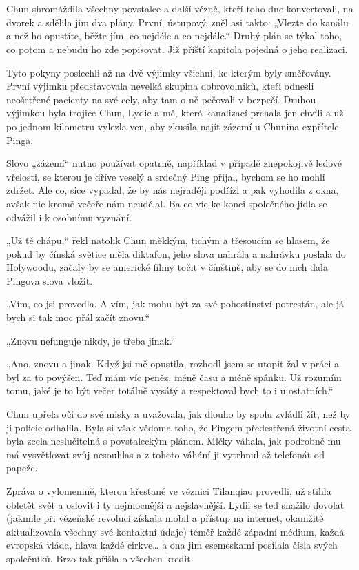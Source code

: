 \chapter{}

Chun shromáždila všechny povstalce a další vězně, kteří toho dne konvertovali, na dvorek a sdělila jim dva plány. První, ústupový, zněl asi takto: „Vlezte do kanálu a než ho opustíte, běžte jím, co nejdéle a co nejdále.“ Druhý plán se týkal toho, co potom a nebudu ho zde popisovat. Již příští kapitola pojedná o jeho realizaci. 

Tyto pokyny poslechli až na dvě výjimky všichni, ke kterým byly směřovány. První výjimku představovala nevelká skupina dobrovolníků, kteří odnesli neošetřené pacienty na své cely, aby tam o ně pečovali v bezpečí. Druhou výjimkou byla trojice Chun, Lydie a mě, která kanalizací prchala jen chvíli a už po jednom kilometru vylezla ven, aby zkusila najít zázemí u Chunina expřítele Pinga.  

Slovo „zázemí“ nutno používat opatrně, například v případě znepokojivě ledové vřelosti, se kterou je dříve veselý a srdečný Ping přijal, bychom se ho mohli zdržet. Ale co, sice vypadal, že by nás nejraději podřízl a pak vyhodila z okna, avšak nic kromě večeře nám neudělal. Ba co víc ke konci společného jídla se odvážil i k osobnímu vyznání. 

„Už tě chápu,“ řekl natolik Chun měkkým, tichým a třesoucím se hlasem, že pokud by čínská světice měla diktafon, jeho slova nahrála a nahrávku poslala do Holywoodu, začaly by se americké filmy točit v čínštině, aby se do nich dala Pingova slova vložit. 

„Vím, co jsi provedla. A vím, jak mohu být za své pohostinství potrestán, ale já bych si tak moc přál začít znovu.“

„Znovu nefunguje nikdy, je třeba jinak.“

„Ano, znovu a jinak. Když jsi mě opustila, rozhodl jsem se utopit žal v práci a byl za to povýšen. Teď mám víc peněz, méně času a méně spánku. Už rozumím tomu, jaké je to být večer totálně vysátý a respektoval bych to i u ostatních.“

Chun upřela oči do své misky a uvažovala, jak dlouho by spolu zvládli žít, než by ji policie odhalila. Byla si však vědoma toho, že Pingem předestřená životní cesta byla zcela neslučitelná s povstaleckým plánem. Mlčky váhala, jak podrobně mu má vysvětlovat svůj nesouhlas a z tohoto váhání ji vytrhnul až telefonát od papeže.
	
Zpráva o vylomenině, kterou křesťané ve věznici Tilanqiao provedli, už stihla obletět svět a oslovit i ty nejmocnější a nejslavnější. Lydii se teď snažilo dovolat (jakmile při vězeňské revoluci získala mobil a přístup na internet, okamžitě aktualizovala všechny své kontaktní údaje) téměř každé západní médium, každá evropská vláda, hlava každé církve… a ona jim esemeskami posílala čísla svých společníků. Brzo tak přišla o všechen kredit.

